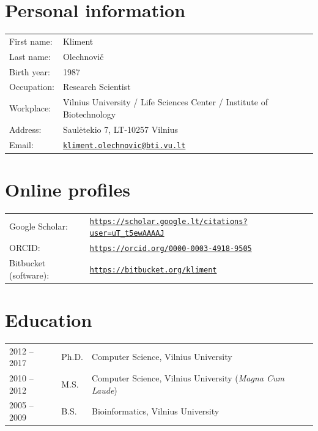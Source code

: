 \documentclass{article}
\begin{document}
\section*{Personal information}
\begin{tabular}{p{}p{}}
First name:          & Kliment \\
Last name:           & Olechnovič \\
Birth year:          & 1987 \\
Occupation:          & Research Scientist \\
Workplace:           & Vilnius University / Life Sciences Center / Institute of Biotechnology \\
Address:             & Saulėtekio 7, LT-10257 Vilnius \\
Email:               & \href{mailto:kliment.olechnovic@bti.vu.lt}{\tt kliment.olechnovic@bti.vu.lt} \\
\end{tabular}


\section*{Online profiles}
\begin{tabular}{p{}p{}}
Google Scholar:             & \href{https://scholar.google.lt/citations?user=uT_t5ewAAAAJ}{\tt https://scholar.google.lt/citations?user=uT\_t5ewAAAAJ} \\
ORCID:                      & \href{https://orcid.org/0000-0003-4918-9505}{\tt https://orcid.org/0000-0003-4918-9505} \\
Bitbucket (software):       & \href{https://bitbucket.org/kliment}{\tt https://bitbucket.org/kliment} \\
\end{tabular}


\section*{Education}
\begin{tabular}{p{}p{}p{}}
2012 -- 2017 & Ph.D. & Computer Science, Vilnius University \\
2010 -- 2012 & M.S.  & Computer Science, Vilnius University (\emph{Magna Cum Laude}) \\
2005 -- 2009 & B.S.  & Bioinformatics, Vilnius University
\end{tabular}
\end{document}
